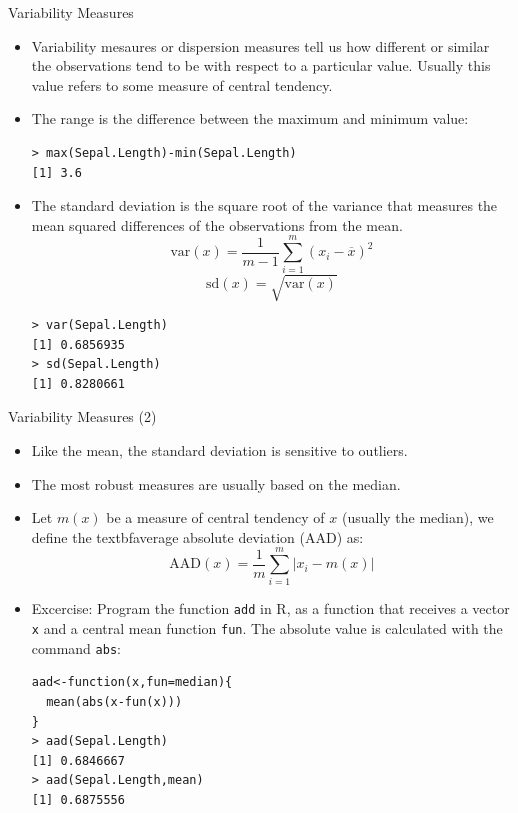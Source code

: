 \documentclass[handout]{beamer}
\begin{document}
\begin{frame}[fragile]{Variability Measures}
\scriptsize{ 
\begin{itemize}
 \item Variability mesaures or dispersion measures tell us how different or similar the observations tend to be with respect to a particular value. Usually this value refers to some measure of central tendency.
 \item  The range is the difference between the maximum and minimum value:
 \begin{verbatim}
> max(Sepal.Length)-min(Sepal.Length)
[1] 3.6
 \end{verbatim}
 \item The standard deviation is the square root of the variance that measures the mean squared differences of the observations from the mean.  
 \begin{displaymath}
  \text{var}(x)=\frac{1}{m-1}\sum_{i=1}^{m}(x_{i} - \overline{x} )^2
 \end{displaymath}
 \begin{displaymath}
  \text{sd}(x)=\sqrt{\text{var}(x)}
 \end{displaymath}

\begin{verbatim}
> var(Sepal.Length)
[1] 0.6856935
> sd(Sepal.Length)
[1] 0.8280661 
\end{verbatim}



\end{itemize}
 
 
 
} 
\end{frame}


\begin{frame}[fragile]{Variability Measures (2)}
\scriptsize{ 
\begin{itemize}
 \item Like the mean, the standard deviation is sensitive to outliers.
 \item The most robust measures are usually based on the median.

  \item Let $m(x)$ be a measure of central tendency of $x$ (usually the median), we define the textbf{average absolute deviation} (AAD)  as:
  \begin{displaymath}
   \text{AAD}(x) = \frac{1}{m}\sum_{i=1}^{m}|x_i-m(x)| 
  \end{displaymath}
  
  \item Excercise: Program the function \verb+add+ in R, as a function that receives a vector \verb+x+ and a central mean function \verb+fun+. The absolute value is calculated with the command \verb+abs+:
  
  \begin{verbatim}
aad<-function(x,fun=median){
  mean(abs(x-fun(x)))
}
> aad(Sepal.Length)
[1] 0.6846667
> aad(Sepal.Length,mean)
[1] 0.6875556
  \end{verbatim}


\end{itemize}
 
 
 
} 
\end{frame}
\end{document}

